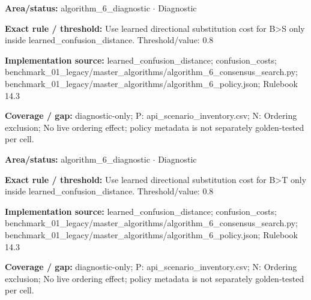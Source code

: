 \begin{tcolorbox}[enhanced,breakable,colback=white,colframe=Muted!45,boxrule=0.45pt,arc=1.5pt,left=6pt,right=6pt,top=5pt,bottom=5pt,title={\texttt{A6-LEARNED-SUBSTITUTION-B-S}},title after break={\texttt{A6-LEARNED-SUBSTITUTION-B-S}\ (continued)},fonttitle=\headingfont\bfseries\color{Navy},coltitle=Navy]
\textbf{Area/status:} algorithm\_\allowbreak{}6\_\allowbreak{}diagnostic $\boldsymbol{\cdot}$ Diagnostic\par
\smallskip
\textbf{Exact rule / threshold:} Use learned directional substitution cost for B>S only inside learned\_\allowbreak{}confusion\_\allowbreak{}distance. Threshold/\allowbreak{}value: 0.8\par
\smallskip
\textbf{Implementation source:} learned\_\allowbreak{}confusion\_\allowbreak{}distance; confusion\_\allowbreak{}costs; benchmark\_\allowbreak{}01\_\allowbreak{}legacy/\allowbreak{}master\_\allowbreak{}algorithms/\allowbreak{}algorithm\_\allowbreak{}6\_\allowbreak{}consensus\_\allowbreak{}search.py; benchmark\_\allowbreak{}01\_\allowbreak{}legacy/\allowbreak{}master\_\allowbreak{}algorithms/\allowbreak{}algorithm\_\allowbreak{}6\_\allowbreak{}policy.json; Rulebook 14.3\par
\smallskip
\textbf{Coverage / gap:} diagnostic-only; P: api\_\allowbreak{}scenario\_\allowbreak{}inventory.csv; N: Ordering exclusion; No live ordering effect; policy metadata is not separately golden-tested per cell.
\end{tcolorbox}
\begin{tcolorbox}[enhanced,breakable,colback=white,colframe=Muted!45,boxrule=0.45pt,arc=1.5pt,left=6pt,right=6pt,top=5pt,bottom=5pt,title={\texttt{A6-LEARNED-SUBSTITUTION-B-T}},title after break={\texttt{A6-LEARNED-SUBSTITUTION-B-T}\ (continued)},fonttitle=\headingfont\bfseries\color{Navy},coltitle=Navy]
\textbf{Area/status:} algorithm\_\allowbreak{}6\_\allowbreak{}diagnostic $\boldsymbol{\cdot}$ Diagnostic\par
\smallskip
\textbf{Exact rule / threshold:} Use learned directional substitution cost for B>T only inside learned\_\allowbreak{}confusion\_\allowbreak{}distance. Threshold/\allowbreak{}value: 0.8\par
\smallskip
\textbf{Implementation source:} learned\_\allowbreak{}confusion\_\allowbreak{}distance; confusion\_\allowbreak{}costs; benchmark\_\allowbreak{}01\_\allowbreak{}legacy/\allowbreak{}master\_\allowbreak{}algorithms/\allowbreak{}algorithm\_\allowbreak{}6\_\allowbreak{}consensus\_\allowbreak{}search.py; benchmark\_\allowbreak{}01\_\allowbreak{}legacy/\allowbreak{}master\_\allowbreak{}algorithms/\allowbreak{}algorithm\_\allowbreak{}6\_\allowbreak{}policy.json; Rulebook 14.3\par
\smallskip
\textbf{Coverage / gap:} diagnostic-only; P: api\_\allowbreak{}scenario\_\allowbreak{}inventory.csv; N: Ordering exclusion; No live ordering effect; policy metadata is not separately golden-tested per cell.
\end{tcolorbox}
